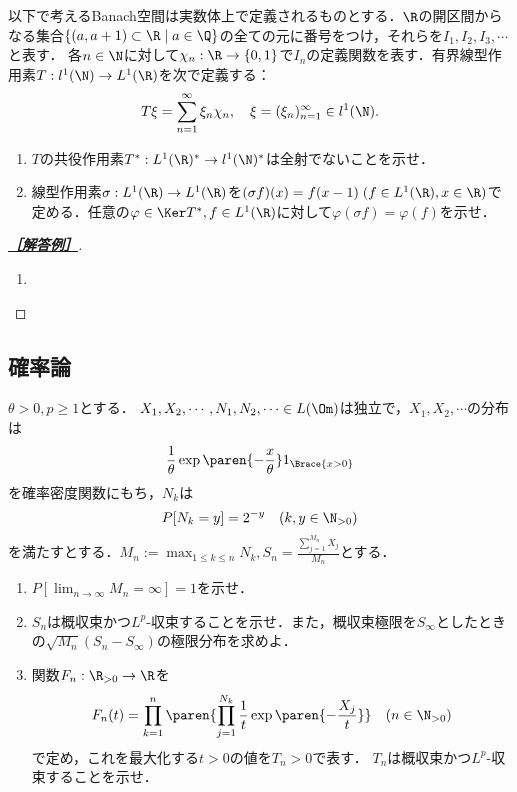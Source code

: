 \documentclass[uplatex,dvipdfmx]{jsarticle}
\begin{document}
\begin{tcolorbox}[colframe=ForestGreen, colback=ForestGreen!10!white,breakable,colbacktitle=ForestGreen!40!white,coltitle=black,fonttitle=\bfseries\sffamily,
    title=B 第11問（関数解析）]
    以下で考えるBanach空間は実数体上で定義されるものとする．$\R$の開区間からなる集合$\{(a,a+1)\subset\R\mid a\in\Q\}$の全ての元に番号をつけ，それらを$I_1,I_2,I_3,\cdots$と表す．
    各$n\in\N$に対して$\chi_n:\R\to\{0,1\}$で$I_n$の定義関数を表す．有界線型作用素$T:l^1(\N)\to L^1(\R)$を次で定義する：
    \[T\xi=\sum_{n=1}^\infty\xi_n\chi_n,\quad\xi=(\xi_n)_{n=1}^\infty\in l^1(\N).\]
    \begin{enumerate}
        \item $T$の共役作用素$T^*:L^1(\R)^*\to l^1(\N)^*$は全射でないことを示せ．
        \item 線型作用素$\sigma:L^1(\R)\to L^1(\R)$を$(\sigma f)(x)=f(x-1)\;(f\in L^1(\R),x\in\R)$で定める．任意の$\varphi\in\Ker T^*,f\in L^1(\R)$に対して$\varphi(\sigma f)=\varphi(f)$を示せ．
    \end{enumerate}
\end{tcolorbox}
\begin{proof}[\textbf{\underline{［解答例］}}]\mbox{}
    \begin{enumerate}
        \item 
    \end{enumerate}
\end{proof}

\subsection{確率論}

\begin{tcolorbox}[colframe=ForestGreen, colback=ForestGreen!10!white,breakable,colbacktitle=ForestGreen!40!white,coltitle=black,fonttitle=\bfseries\sffamily,
title=B 第13問（確率論）]
    $\theta>0,p\ge1$とする．
    $X_1,X_2,\cdots,N_1,N_2,\cdots\in L(\Om)$は独立で，$X_1,X_2,\cdots$の分布は
    \[\frac{1}{\theta}\exp\paren{-\frac{x}{\theta}}1_{\Brace{x>0}}\]
    を確率密度関数にもち，$N_k$は
    \[P[N_k=y]=2^{-y}\quad(k,y\in\N_{>0})\]
    を満たすとする．$M_n:=\max_{1\le k\le n}N_k,S_n=\frac{\sum^{M_n}_{j=1}X_j}{M_n}$とする．
    \begin{enumerate}
        \item $P[\lim_{n\to\infty}M_n=\infty]=1$を示せ．
        \item $S_n$は概収束かつ$L^p$-収束することを示せ．また，概収束極限を$S_\infty$としたときの$\sqrt{M_n}(S_n-S_\infty)$の極限分布を求めよ．
        \item 関数$F_n:\R_{>0}\to\R$を
        \[F_n(t)=\prod^n_{k=1}\paren{\prod^{N_k}_{j=1}\frac{1}{t}\exp\paren{-\frac{X_j}{t}}}\quad(n\in\N_{>0})\]
        で定め，これを最大化する$t>0$の値を$T_n>0$で表す．
        $T_n$は概収束かつ$L^p$-収束することを示せ．
    \end{enumerate}
\end{tcolorbox}
\end{document}
